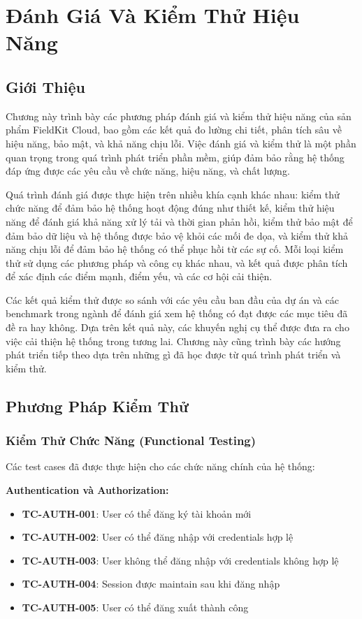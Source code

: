 \section{Đánh Giá Và Kiểm Thử Hiệu Năng}

\subsection{Giới Thiệu}

Chương này trình bày các phương pháp đánh giá và kiểm thử hiệu năng của sản phẩm FieldKit Cloud, bao gồm các kết quả đo lường chi tiết, phân tích sâu về hiệu năng, bảo mật, và khả năng chịu lỗi. Việc đánh giá và kiểm thử là một phần quan trọng trong quá trình phát triển phần mềm, giúp đảm bảo rằng hệ thống đáp ứng được các yêu cầu về chức năng, hiệu năng, và chất lượng.

Quá trình đánh giá được thực hiện trên nhiều khía cạnh khác nhau: kiểm thử chức năng để đảm bảo hệ thống hoạt động đúng như thiết kế, kiểm thử hiệu năng để đánh giá khả năng xử lý tải và thời gian phản hồi, kiểm thử bảo mật để đảm bảo dữ liệu và hệ thống được bảo vệ khỏi các mối đe dọa, và kiểm thử khả năng chịu lỗi để đảm bảo hệ thống có thể phục hồi từ các sự cố. Mỗi loại kiểm thử sử dụng các phương pháp và công cụ khác nhau, và kết quả được phân tích để xác định các điểm mạnh, điểm yếu, và các cơ hội cải thiện.

Các kết quả kiểm thử được so sánh với các yêu cầu ban đầu của dự án và các benchmark trong ngành để đánh giá xem hệ thống có đạt được các mục tiêu đã đề ra hay không. Dựa trên kết quả này, các khuyến nghị cụ thể được đưa ra cho việc cải thiện hệ thống trong tương lai. Chương này cũng trình bày các hướng phát triển tiếp theo dựa trên những gì đã học được từ quá trình phát triển và kiểm thử.

\subsection{Phương Pháp Kiểm Thử}

\subsubsection{Kiểm Thử Chức Năng (Functional Testing)}

Các test cases đã được thực hiện cho các chức năng chính của hệ thống:

\textbf{Authentication và Authorization:}
\begin{itemize}
    \item \textbf{TC-AUTH-001}: User có thể đăng ký tài khoản mới
    \item \textbf{TC-AUTH-002}: User có thể đăng nhập với credentials hợp lệ
    \item \textbf{TC-AUTH-003}: User không thể đăng nhập với credentials không hợp lệ
    \item \textbf{TC-AUTH-004}: Session được maintain sau khi đăng nhập
    \item \textbf{TC-AUTH-005}: User có thể đăng xuất thành công
\end{itemize}

